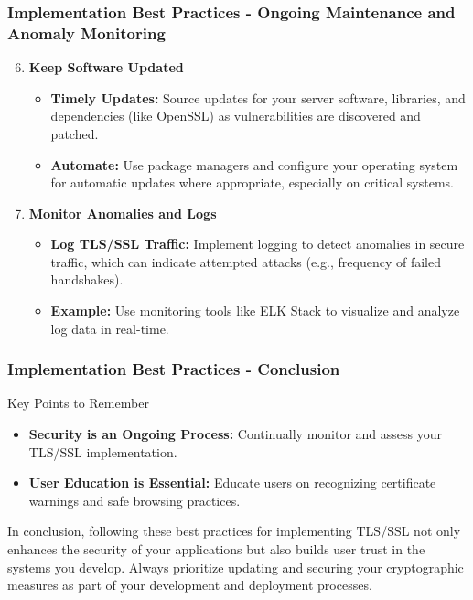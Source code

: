 \documentclass{beamer}
\begin{document}
\begin{frame}[fragile]
    \frametitle{Implementation Best Practices - Ongoing Maintenance and Anomaly Monitoring}
    \begin{enumerate}
        \setcounter{enumi}{5} %
        \item \textbf{Keep Software Updated}
        \begin{itemize}
            \item \textbf{Timely Updates:} Source updates for your server software, libraries, and dependencies (like OpenSSL) as vulnerabilities are discovered and patched.
            \item \textbf{Automate:} Use package managers and configure your operating system for automatic updates where appropriate, especially on critical systems.
        \end{itemize}
        
        \item \textbf{Monitor Anomalies and Logs}
        \begin{itemize}
            \item \textbf{Log TLS/SSL Traffic:} Implement logging to detect anomalies in secure traffic, which can indicate attempted attacks (e.g., frequency of failed handshakes).
            \item \textbf{Example:} Use monitoring tools like ELK Stack to visualize and analyze log data in real-time.
        \end{itemize}
    \end{enumerate}
\end{frame}

\begin{frame}[fragile]
    \frametitle{Implementation Best Practices - Conclusion}
    \begin{block}{Key Points to Remember}
        \begin{itemize}
            \item \textbf{Security is an Ongoing Process:} Continually monitor and assess your TLS/SSL implementation.
            \item \textbf{User Education is Essential:} Educate users on recognizing certificate warnings and safe browsing practices.
        \end{itemize}
    \end{block}
    
    In conclusion, following these best practices for implementing TLS/SSL not only enhances the security of your applications but also builds user trust in the systems you develop. Always prioritize updating and securing your cryptographic measures as part of your development and deployment processes.
\end{frame}
\end{document}
